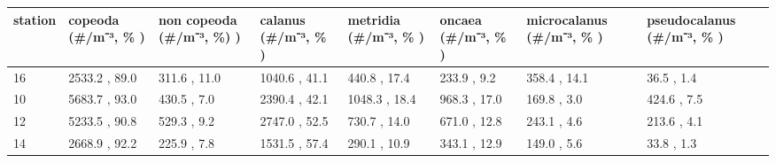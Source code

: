 \begin{tabular}{llllllll}
\toprule
station & copeoda (\#/m⁻³, \% ) & non copeoda (\#/m⁻³, \%) ) & calanus (\#/m⁻³, \% ) & metridia (\#/m⁻³, \% ) & oncaea (\#/m⁻³, \% ) & microcalanus (\#/m⁻³, \% ) & pseudocalanus (\#/m⁻³, \% ) \\
\midrule
     16 &       2533.2 , 89.0 &             311.6 , 11.0 &       1040.6 , 41.1 &         440.8 , 17.4 &        233.9 , 9.2 &             358.4 , 14.1 &                36.5 , 1.4 \\
     10 &       5683.7 , 93.0 &              430.5 , 7.0 &       2390.4 , 42.1 &        1048.3 , 18.4 &       968.3 , 17.0 &              169.8 , 3.0 &               424.6 , 7.5 \\
     12 &       5233.5 , 90.8 &              529.3 , 9.2 &       2747.0 , 52.5 &         730.7 , 14.0 &       671.0 , 12.8 &              243.1 , 4.6 &               213.6 , 4.1 \\
     14 &       2668.9 , 92.2 &              225.9 , 7.8 &       1531.5 , 57.4 &         290.1 , 10.9 &       343.1 , 12.9 &              149.0 , 5.6 &                33.8 , 1.3 \\
\bottomrule
\end{tabular}

